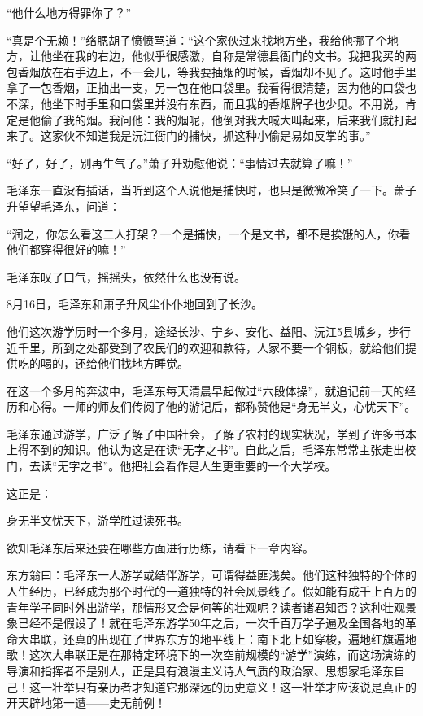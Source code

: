 \documentclass[../../dazhuan.tex]{subfiles}
\begin{document}
“他什么地方得罪你了？”

“真是个无赖！”络腮胡子愤愤骂道：“这个家伙过来找地方坐，我给他挪了个地方，让他坐在我的右边，他似乎很感激，自称是常德县衙门的文书。我把我买的两包香烟放在右手边上，不一会儿，等我要抽烟的时候，香烟却不见了。这时他手里拿了一包香烟，正抽出一支，另一包在他口袋里。我看得很清楚，因为他的口袋也不深，他坐下时手里和口袋里并没有东西，而且我的香烟牌子也少见。不用说，肯定是他偷了我的烟。我问他：我的烟呢，他倒对我大喊大叫起来，后来我们就打起来了。这家伙不知道我是沅江衙门的捕快，抓这种小偷是易如反掌的事。”

“好了，好了，别再生气了。”萧子升劝慰他说：“事情过去就算了嘛！”

毛泽东一直没有插话，当听到这个人说他是捕快时，也只是微微冷笑了一下。萧子升望望毛泽东，问道：

“润之，你怎么看这二人打架？一个是捕快，一个是文书，都不是挨饿的人，你看他们都穿得很好的嘛！”

毛泽东叹了口气，摇摇头，依然什么也没有说。

8月16日，毛泽东和萧子升风尘仆仆地回到了长沙。

他们这次游学历时一个多月，途经长沙、宁乡、安化、益阳、沅江5县城乡，步行近千里，所到之处都受到了农民们的欢迎和款待，人家不要一个铜板，就给他们提供吃的喝的，还给他们找地方睡觉。

在这一个多月的奔波中，毛泽东每天清晨早起做过“六段体操”，就追记前一天的经历和心得。一师的师友们传阅了他的游记后，都称赞他是“身无半文，心忧天下”。

毛泽东通过游学，广泛了解了中国社会，了解了农村的现实状况，学到了许多书本上得不到的知识。他认为这是在读“无字之书”。自此之后，毛泽东常常主张走出校门，去读“无字之书”。他把社会看作是人生更重要的一个大学校。

这正是：\begin{xemph}身无半文忧天下，游学胜过读死书。\end{xemph}

欲知毛泽东后来还要在哪些方面进行历练，请看下一章内容。

东方翁曰：毛泽东一人游学或结伴游学，可谓得益匪浅矣。他们这种独特的个体的人生经历，已经成为那个时代的一道独特的社会风景线了。假如能有成千上百万的青年学子同时外出游学，那情形又会是何等的壮观呢？读者诸君知否？这种壮观景象已经不是假设了！就在毛泽东游学50年之后，一次千百万学子遍及全国各地的革命大串联，还真的出现在了世界东方的地平线上：南下北上如穿梭，遍地红旗遍地歌！这次大串联正是在那特定环境下的一次空前规模的“游学”演练，而这场演练的导演和指挥者不是别人，正是具有浪漫主义诗人气质的政治家、思想家毛泽东自己！这一壮举只有亲历者才知道它那深远的历史意义！这一壮举才应该说是真正的开天辟地第一遭——史无前例！
\end{document}

